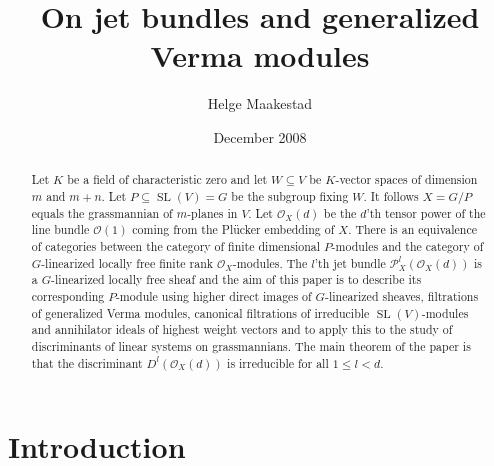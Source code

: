 \documentclass{amsart}
\theoremstyle{plain}
\theoremstyle{definition}
\theoremstyle{remark}
\numberwithin{equation}{theorem}
\begin{document}
\title{On jet bundles and generalized Verma modules} 

\author{Helge Maakestad}
\address{Institut Fourier, Grenoble}



\date{December 2008}

\begin{abstract} Let $K$ be a field of characteristic zero and let
  $W\subseteq V$ be $K$-vector spaces of dimension $m$ and $m+n$. Let
  $P\subseteq {\operatorname{SL}}(V)=G$ be the subgroup fixing $W$. It follows
  $X=G/P$ equals the grassmannian of $m$-planes in $V$. Let ${\mathcal{O} }_X(d)$
  be the $d$'th tensor power of the line bundle ${\mathcal{O} }(1)$ coming from
  the Pl\"{u}cker embedding of $X$. There is an
  equivalence of categories between the category of finite dimensional
  $P$-modules and the category of $G$-linearized locally free finite rank
  ${\mathcal{O} }_{X}$-modules. The $l$'th jet bundle ${\mathcal{P} }^l_X({\mathcal{O} }_X(d))$ 
  is a $G$-linearized locally free sheaf and the aim of this paper is to
  describe its corresponding $P$-module using higher direct images of
  $G$-linearized sheaves, filtrations of generalized Verma modules,
  canonical filtrations of irreducible ${\operatorname{SL}}(V)$-modules and annihilator ideals of
  highest weight vectors and to apply this to the study of
  discriminants of linear systems on grassmannians.
The main theorem of the paper is that the discriminant $D^l({\mathcal{O} }_X(d))$
is irreducible for all $1\leq l < d$.
\end{abstract}

\maketitle

\tableofcontents

\section{Introduction} 
\end{document}
